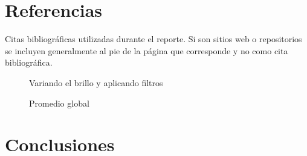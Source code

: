 \documentclass{article}
\begin{document}
\section{Referencias}
Citas bibliográficas utilizadas durante el reporte. Si son sitios web o repositorios se incluyen generalmente al pie de la página que corresponde y no como cita bibliográfica.



\begin{figure}[!hb]
  \centering
  \caption{Variando el brillo y aplicando filtros}
\end{figure}


\begin{figure}[!hb]
  \centering
  \caption{Promedio global}
\end{figure}



\section{Conclusiones}
\end{document}

